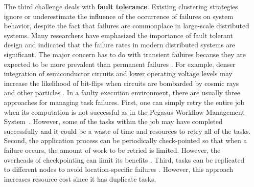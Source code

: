 
The third challenge deals with \textbf{fault tolerance}. Existing clustering strategies ignore or underestimate the influence of the occurrence of failures on system behavior, despite the fact that failures are commonplace in large-scale distributed systems. Many researchers \cite{Zhang2004, Tang1990, Schroeder2006, Sahoo2004} have emphasized the importance of fault tolerant design and indicated that the failure rates in modern distributed systems are significant. The major concern has to do with transient failures because they are expected to be more prevalent than permanent failures \cite{Zhang2004}. For example, denser integration of semiconductor circuits and lower operating voltage levels may increase the likelihood of bit-flips when circuits are bombarded by cosmic rays and other particles \cite{Zhang2004}. In a faulty execution environment, there are usually three approaches for managing task failures. First, one can simply retry the entire job when its computation is not successful as in the Pegasus Workflow Management System~\cite{Deelman2004}. However, some of the tasks within the job may have completed successfully and it could be a waste of time and resources to retry all of the tasks. Second, the application process can be periodically check-pointed so that when a failure occurs, the amount of work to be retried is limited. However, the overheads of checkpointing can limit its benefits \cite{Zhang2004}. Third, tasks can be replicated to different nodes to avoid location-specific failures \cite{Zhang2009}. However, this approach increases resource cost since it has duplicate tasks. 

